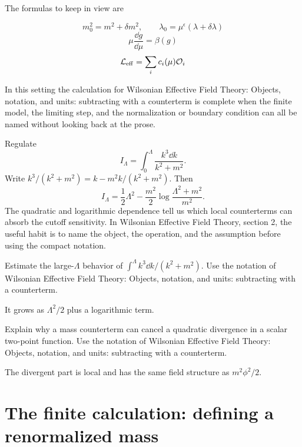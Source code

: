 The formulas to keep in view are

\[
  m_0^2=m^2+\delta m^2,\qquad \lambda_0=\mu^\epsilon(\lambda+\delta\lambda)
\]
\[
  \mu\frac{\dd g}{\dd\mu}=\beta(g)
\]
\[
  \mathcal L_{\mathrm{eff}}=\sum_i c_i(\mu)\mathcal O_i
\]

In this setting the calculation for Wilsonian Effective Field Theory: Objects, notation, and units: subtracting with a counterterm is complete when the finite model, the limiting step, and the normalization or boundary condition can all be named without looking back at the prose.




\begin{example}
Regulate
\[
  I_\Lambda=\int_0^\Lambda\frac{k^3\dd k}{k^2+m^2}.
\]
Write \(k^3/(k^2+m^2)=k-m^2k/(k^2+m^2)\).  Then
\[
  I_\Lambda=\frac12\Lambda^2-\frac{m^2}{2}\log\frac{\Lambda^2+m^2}{m^2}.
\]
The quadratic and logarithmic dependence tell us which local counterterms can absorb the cutoff sensitivity.  In Wilsonian Effective Field Theory, section 2, the useful habit is to name the object, the operation, and the assumption before using the compact notation.
\end{example}



\begin{exercise}
Estimate the large-\(\Lambda\) behavior of \(\int^\Lambda k^3\dd k/(k^2+m^2)\).  Use the notation of Wilsonian Effective Field Theory: Objects, notation, and units: subtracting with a counterterm.
\begin{answer}
It grows as \(\Lambda^2/2\) plus a logarithmic term.
\end{answer}
\end{exercise}

\begin{exercise}
Explain why a mass counterterm can cancel a quadratic divergence in a scalar two-point function.  Use the notation of Wilsonian Effective Field Theory: Objects, notation, and units: subtracting with a counterterm.
\begin{answer}
The divergent part is local and has the same field structure as \(m^2\phi^2/2\).
\end{answer}
\end{exercise}



\section{The finite calculation: defining a renormalized mass}

